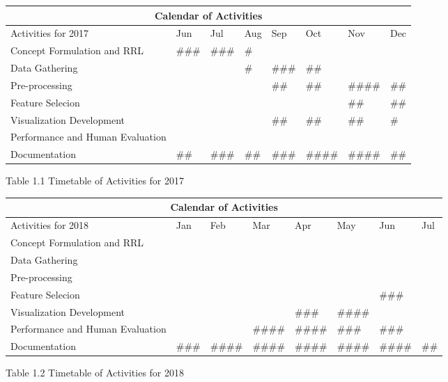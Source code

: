 \begin{center}
\begin{tabular}{ |p{3.7cm}|p{1.2cm}|p{1.2cm}|p{1.2cm}|p{1.2cm}|p{1.2cm}|p{1.2cm}|p{1.2cm}| }
 \hline
 \multicolumn{8}{|c|}{Calendar of Activities} \\
 \hline
 Activities for 2017& Jun&Jul&Aug&Sep&Oct&Nov&Dec\\
 \hline
Concept Formulation and RRL&\#\#\#& \#\#\# &\#&&&&
 \\
\hline
Data Gathering&&&\#&\#\#\#&\#\#&&
 \\
\hline
Pre-processing&&&&\#\#&\#\#&\#\#\#\#&\#\#
 \\
 \hline
Feature Selecion&&&&&&\#\#&\#\#
 \\
 \hline
Visualization Development&&&&\#\#&\#\#&\#\#&\#
 \\
 \hline
Performance and Human Evaluation&&&&&&&
 \\
 \hline
Documentation&\#\#&\#\#\#& \#\#&\#\#\#&\#\#\#\#&\#\#\#\#&\#\#
 \\
 \hline
\end{tabular}
\end{center}
Table 1.1 Timetable of Activities for 2017

\begin{center}
\begin{tabular}{ |p{3.7cm}|p{1.2cm}|p{1.2cm}|p{1.2cm}|p{1.2cm}|p{1.2cm}|p{1.2cm}|p{1.2cm}| }
 \hline
 \multicolumn{8}{|c|}{Calendar of Activities} \\
 \hline
 Activities for 2018& Jan&Feb&Mar&Apr&May&Jun&Jul\\
 \hline
Concept Formulation and RRL&&&&&&&
 \\
\hline
Data Gathering&&&&&&&
 \\
\hline
Pre-processing&&&&&&&    
 \\
 \hline
Feature Selecion&&&&&&\#\#\#&    
 \\
 \hline
Visualization Development&&&&\#\#\#& \#\#\#\#&& 
 \\
 \hline
Performance and Human Evaluation&&&\#\#\#\#&\#\#\#\#&\#\#\#&\#\#\#&
 \\
 \hline
Documentation&\#\#\#&\#\#\#\#&\#\#\#\#&\#\#\#\#&\#\#\#\#&\#\#\#\#&\#\#
 \\
 \hline
\end{tabular}
\end{center}
Table 1.2 Timetable of Activities for 2018